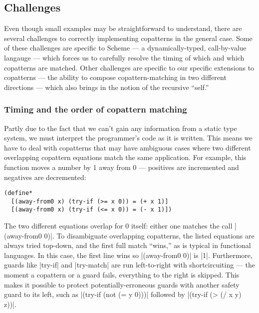 
\subsection{Challenges}

Even though small examples may be straightforward to understand, there are several challenges to correctly implementing copatterns in the general case.
Some of these challenges are specific to Scheme --- a dynamically-typed, call-by-value langauge --- which forces us to carefully resolve the timing of which and which copatterns are matched.
Other challenges are specific to our specific extensions to copatterns --- the ability to compose copattern-matching in two different directions --- which also brings in the notion of the recursive ``self.''

\subsubsection{Timing and the order of copattern matching}
\label{sec:timing-challenges}

Partly due to the fact that we can't gain any information from a static type system, we must interpret the programmer's code as it is written.
This means we have to deal with copatterns that may have ambiguous cases where two different overlapping copattern equations match the same application.
For example, this function moves a number by 1 away from 0 --- positives are incremented and negatives are decremented:
\begin{verbatim}
(define*
  [(away-from0 x) (try-if (>= x 0)) = (+ x 1)]
  [(away-from0 x) (try-if (<= x 0)) = (- x 1)])
\end{verbatim}
The two different equations overlap for 0 itself: either one matches the call \scm|(away-from0 0)|.
To disambiguate overlapping copatterns, the listed equations are always tried top-down, and the first full match ``wins,'' as is typical in functional languages.
In this case, the first line wins so \scm|(away-from0 0)| is \scm|1|.
Furthermore, guards like \scm|try-if| and \scm|try-match| are run left-to-right with shortcircuiting --- the moment a copattern or a guard fails, everything to the right is skipped.
This makes it possible to protect potentially-erroneous guards with another safety guard to its left, such as \scm|(try-if (not (= y 0)))| followed by \scm|(try-if (> (/ x y) z))|.

